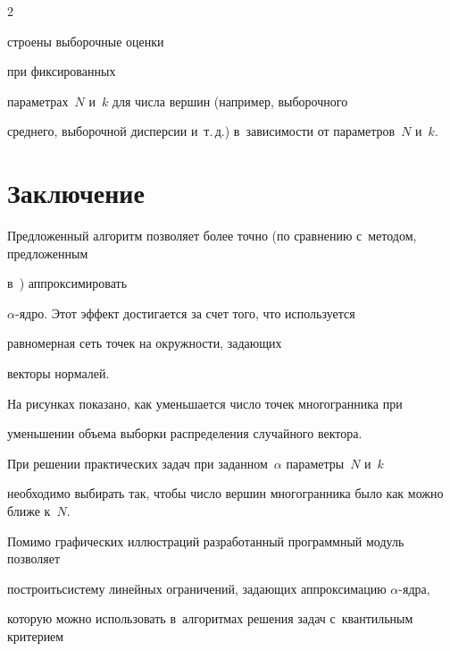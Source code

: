 \begin{multicols}{2}



\noindent

стро\-ены выборочные оценки 

при фиксированных

 па\-ра\-мет\-рах~$N$ и~$k$   для числа вершин (например, выборочного 

среднего, выборочной дис\-пер\-сии и~т.\,д.) в~за\-ви\-си\-мости от па\-ра\-мет\-ров~$N$ и~$k.$



\vspace*{-9pt}



\section{Заключение }



Предложенный алгоритм позволяет более точно (по сравнению с~методом, предложенным 

в~\cite{vaskan}) аппроксимировать

 $\alpha$-яд\-ро. Этот эффект достигается за счет того, что используется 

 равномерная сеть точек на окруж\-ности, за\-да\-ющих

 векторы нор\-малей.

 {

 

 }



На рисунках показано, как уменьшается число точек многогранника при 

уменьшении объема выборки распределения случайного вектора.



При решении практических задач при заданном~$\alpha$ па\-ра\-мет\-ры~$N$ и~$k$  

необходимо выбирать так, чтобы чис\-ло вершин многогранника было как можно ближе к~$N.$



Помимо графических иллюстраций разработанный программный модуль позволяет 

построить\linebreak сис\-те\-му линейных ограничений, за\-да\-ющих аппроксимацию $\alpha$-яд\-ра, 

которую можно использовать в~алгоритмах решения задач с~квантильным критерием 


\end{multicols}
